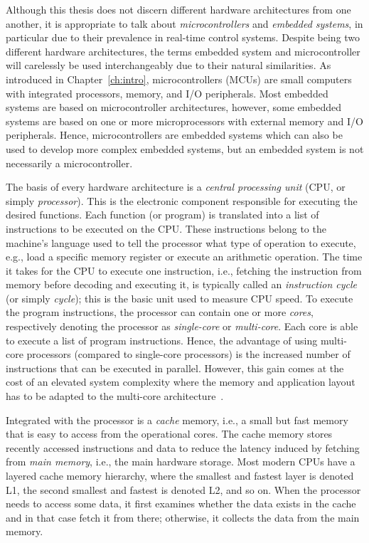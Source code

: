 Although this thesis does not discern different hardware architectures from one another, it is appropriate to talk about \emph{microcontrollers} and \emph{embedded systems}, in particular due to their prevalence in real-time control systems. 
Despite being two different hardware architectures, the terms embedded system and microcontroller will carelessly be used interchangeably due to their natural similarities.
As introduced in Chapter~\ref{ch:intro}, microcontrollers (MCUs) are small computers with integrated processors, memory, and I/O peripherals.
Most embedded systems are based on microcontroller architectures, however, some embedded systems are based on one or more microprocessors with external memory and I/O peripherals.
Hence, microcontrollers are embedded systems which can also be used to develop more complex embedded systems, but an embedded system is not necessarily a microcontroller.

The basis of every hardware architecture is a \emph{central processing unit} (CPU, or simply \emph{processor}).
This is the electronic component responsible for executing the desired functions.
Each function (or program) is translated into a list of instructions to be executed on the CPU.
These instructions belong to the machine's language used to tell the processor what type of operation to execute, e.g., load a specific memory register or execute an arithmetic operation.
The time it takes for the CPU to execute one instruction, i.e., fetching the instruction from memory before decoding and executing it, is typically called an \emph{instruction cycle} (or simply \emph{cycle}); this is the basic unit used to measure CPU speed.
To execute the program instructions, the processor can contain one or more \emph{cores}, respectively denoting the processor as \emph{single-core} or \emph{multi-core}.
Each core is able to execute a list of program instructions.
Hence, the advantage of using multi-core processors (compared to single-core processors) is the increased number of instructions that can be executed in parallel. 
However, this gain comes at the cost of an elevated system complexity where the memory and application layout has to be adapted to the multi-core architecture~\cite{Brandenburg:2011}.

Integrated with the processor is a \emph{cache} memory, i.e., a small but fast memory that is easy to access from the operational cores.
The cache memory stores recently accessed instructions and data to reduce the latency induced by fetching from \emph{main memory}, i.e., the main hardware storage.
Most modern CPUs have a layered cache memory hierarchy, where the smallest and fastest layer is denoted L1, the second smallest and fastest is denoted L2, and so on.
When the processor needs to access some data, it first examines whether the data exists in the cache and in that case fetch it from there; otherwise, it collects the data from the main memory.

